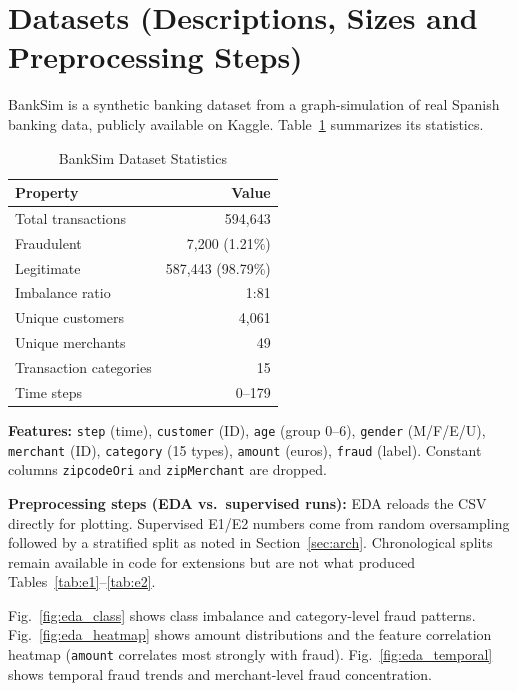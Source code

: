 \documentclass[conference]{IEEEtran}
\begin{document}
\section{Datasets (Descriptions, Sizes and Preprocessing Steps)}

BankSim \cite{b1} is a synthetic banking dataset from a graph-simulation of real Spanish banking data, publicly available on Kaggle. Table~\ref{tab:dataset} summarizes its statistics.

\begin{table}[htbp]
\centering
\caption{BankSim Dataset Statistics}
\label{tab:dataset}
\begin{tabular}{@{}lr@{}}
\toprule
\textbf{Property} & \textbf{Value} \\
\midrule
Total transactions      & 594{,}643 \\
Fraudulent              & 7{,}200 (1.21\%) \\
Legitimate              & 587{,}443 (98.79\%) \\
Imbalance ratio         & 1:81 \\
Unique customers        & 4{,}061 \\
Unique merchants        & 49 \\
Transaction categories  & 15 \\
Time steps              & 0--179 \\
\bottomrule
\end{tabular}
\end{table}

\textbf{Features:} \texttt{step} (time), \texttt{customer} (ID), \texttt{age} (group 0--6), \texttt{gender} (M/F/E/U), \texttt{merchant} (ID), \texttt{category} (15 types), \texttt{amount} (euros), \texttt{fraud} (label). Constant columns \texttt{zipcodeOri} and \texttt{zipMerchant} are dropped.

\textbf{Preprocessing steps (EDA vs.\ supervised runs):} EDA reloads the CSV directly for plotting. Supervised E1/E2 numbers come from random oversampling followed by a stratified split as noted in Section~\ref{sec:arch}. Chronological splits remain available in code for extensions but are not what produced Tables~\ref{tab:e1}--\ref{tab:e2}.

Fig.~\ref{fig:eda_class} shows class imbalance and category-level fraud patterns. Fig.~\ref{fig:eda_heatmap} shows amount distributions and the feature correlation heatmap (\texttt{amount} correlates most strongly with fraud). Fig.~\ref{fig:eda_temporal} shows temporal fraud trends and merchant-level fraud concentration.
\end{document}
